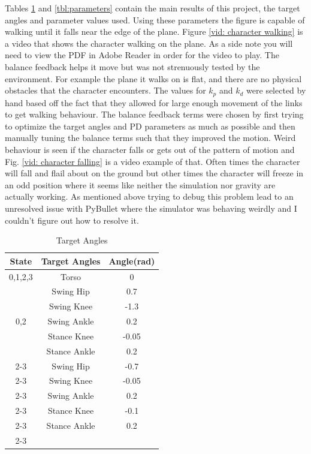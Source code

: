 \documentclass[12pt, a4paper]{article}
\begin{document}
Tables \ref{tbl: target angles} and \ref{tbl:parameters} contain the main results of this project, the target angles and parameter values used. Using these parameters the figure is capable of walking until it falls near the edge of the plane. Figure \ref{vid: character walking} is a video that shows the character walking on the plane. As a side note you will need to view the PDF in Adobe Reader in order for the video to play. The balance feedback helps it move but was not strenuously tested by the environment. For example the plane it walks on is flat, and there are no physical obstacles that the character encounters. The values for $k_p$ and $k_d$ were selected by hand based off the fact that they allowed for large enough movement of the links to get walking behaviour. The balance feedback terms were chosen by first trying to optimize the target angles and PD parameters as much as possible and then manually tuning the balance terms such that they improved the motion. Weird behaviour is seen if the character falls or gets out of the pattern of motion and Fig. \ref{vid: character falling} is a video example of that. Often times the character will fall and flail about on the ground but other times the character will freeze in an odd position where it seems like neither the simulation nor gravity are actually working. As mentioned above trying to debug this problem lead to an unresolved issue with PyBullet where the simulator was behaving weirdly and I couldn't figure out how to resolve it. 
\begin{table}[ht]
\caption{Target Angles}
\begin{center}
\begin{tabular}{|c|c|c|}
\hline
State & Target Angles & Angle(rad) \\
\hline
0,1,2,3 & Torso & 0\\
\hline
\multirow{5}{*}{0,2}&Swing Hip & 0.7\\\cline{2-3}
& Swing Knee & -1.3\\ \cline{2-3}
& Swing Ankle & 0.2\\\cline{2-3}
& Stance Knee& -0.05\\\cline{2-3}
&Stance Ankle & 0.2\\\cline{2-3}
\hline
\multirow{5}{*}{1,3}&Swing Hip & -0.7\\\cline{2-3}
& Swing Knee & -0.05\\ \cline{2-3}
& Swing Ankle & 0.2\\\cline{2-3}
& Stance Knee& -0.1\\\cline{2-3}
&Stance Ankle & 0.2\\\cline{2-3}
\hline
\end{tabular}
\end{center}
\label{tbl: target angles}
\end{table}
\end{document}
